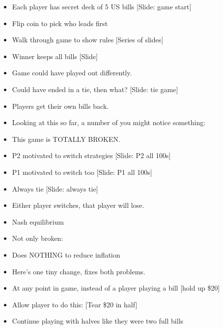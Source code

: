 \documentclass[12pt]{article}
\begin{document}
{\begin{itemize}

\item Each player has secret deck of 5 US bills [Slide:  game start]

\item Flip coin to pick who leads first

\item Walk through game to show rules [Series of slides]

\item Winner keeps all bills [Slide]

\item Game could have played out differently.

\item Could have ended in a tie, then what? [Slide: tie game]

\item Players get their own bills back.

\item Looking at this so far, a number of you might notice something:

\item This game is TOTALLY BROKEN.

\item P2 motivated to switch strategies [Slide:  P2 all 100s]

\item P1 motivated to switch too [Slide:  P1 all 100s]

\item Always tie [Slide:  always tie]

\item Either player switches, that player will lose.

\item Nash equilibrium

\item Not only broken:

\item Does NOTHING to reduce inflation

\item Here's one tiny change, fixes both problems.

\item At any point in game, instead of a player playing a bill [hold up \$20]

\item Allow player to do this:  [Tear \$20 in half]

\item Continue playing with halves like they were two full bills


\end{itemize}}
\end{document}
